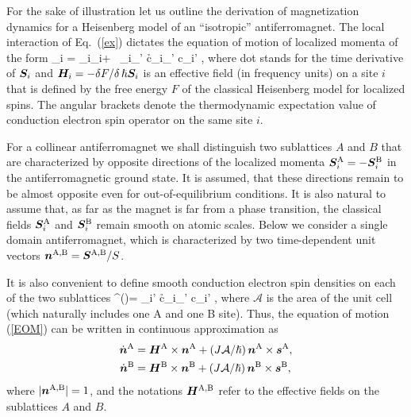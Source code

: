 For the sake of illustration let us outline the derivation of magnetization dynamics for a Heisenberg model of an ``isotropic'' antiferromagnet. The local interaction of Eq.~(\ref{ex}) dictates the equation of motion of localized momenta of the form
\be
\label{EOM}
_i = _i\times {}_i+ \, _i\times \s_{\sigma\sigma'} \lt\la c\h_{i\sigma}\bb{\sigma}_{\sigma\sigma'} c\0_{i\sigma'} \rt\ra,
\e
where dot stands for the time derivative of $\boldsymbol{S}_i$ and $\boldsymbol{H}_i=-\delta F/ \delta\, \hslash\boldsymbol{S}_i$ is an effective field (in frequency units) on a site $i$  that is defined by the free energy $F$ of the classical Heisenberg model for localized spins. The angular brackets denote the thermodynamic expectation value of conduction electron spin operator on the same site $i$. 

For a collinear antiferromagnet we shall distinguish two sublattices $A$ and $B$ that are characterized by opposite directions of the localized momenta $\boldsymbol{S}_i^\text{A}=-\boldsymbol{S}_i^\text{B}$ in the antiferromagnetic ground state. It is assumed, that these directions remain to be almost opposite even for out-of-equilibrium conditions. It is also natural to assume that, as far as the magnet is far from a phase transition, the classical fields $\boldsymbol{S}_i^\text{A}$ and $\boldsymbol{S}_i^\text{B}$ remain smooth on atomic scales. Below we consider a single domain antiferromagnet, which is characterized by two time-dependent unit vectors $\boldsymbol{n}^\text{A,B}=\boldsymbol{S}^\text{A,B}/S$. 

It is also convenient to define smooth conduction electron spin densities on each of the two sublattices
\be
{}^()=  \s_{i\sigma\sigma'} \lt\la c\h_{i\sigma}\bb{\sigma}_{\sigma\sigma'} c\0_{i\sigma'} \rt\ra\;,
\e
where $\mathcal{A}$ is the area of the unit cell (which naturally includes one A and one B site). Thus, the equation of motion (\ref{EOM}) can be written in  continuous approximation as
\beml
\label{EOMAFM}
\begin{align}
\dot{\boldsymbol{n}}^\text{A} &= \boldsymbol{H}^\text{A}\times \boldsymbol{n}^\text{A}+ (J\mathcal{A}/\hslash)\, \boldsymbol{n}^\text{A}\times \boldsymbol{s}^\text{A},\\
\dot{\boldsymbol{n}}^\text{B}&= \boldsymbol{H}^\text{B}\times \boldsymbol{n}^\text{B}+ (J\mathcal{A}/\hslash)\, \boldsymbol{n}^\text{B}\times \boldsymbol{s}^\text{B},
\end{align}
\eml
where $|\boldsymbol{n}^\text{A,B}|=1$, and the notations $\boldsymbol{H}^\text{A,B}$ refer to the effective fields on the sublattices $A$ and $B$. 

